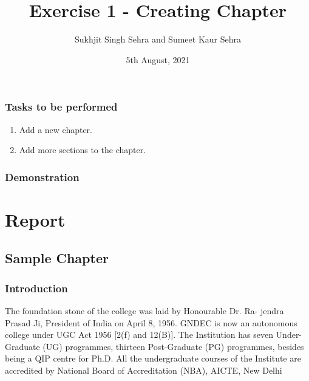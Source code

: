 \documentclass[a4paper,12pt,twoside]{report}
\title{Exercise 1 - Creating Chapter}
\author{Sukhjit Singh Sehra and Sumeet Kaur Sehra}
\date{5th August, 2021}
\begin{document}
\maketitle	

\section*{Tasks to be performed}
\begin{enumerate}	
\item Add a new chapter.
\item Add more sections to the chapter.
\end{enumerate}
\section*{Demonstration}
\part{Report}
\chapter{Sample Chapter}
\section{Introduction}
The foundation stone of the college was laid by Honourable Dr. Ra-
jendra Prasad Ji, President of India on April 8, 1956. GNDEC is now an
autonomous college under UGC Act 1956 [2(f) and 12(B)]. The Institution
has seven Under-Graduate (UG) programmes, thirteen Post-Graduate (PG)
programmes, besides being a QIP centre for Ph.D. All the undergraduate
courses of the Institute are accredited by National Board of Accreditation
(NBA), AICTE, New Delhi
\end{document}
